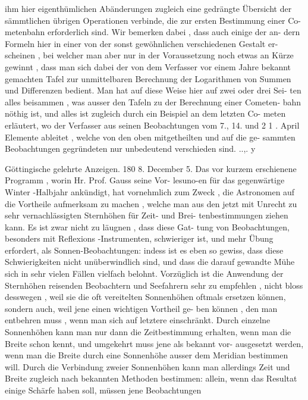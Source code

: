\documentclass[12pt,a4paper]{article}
\begin{document}
\newpage

ihm  hier  eigenthümlichen  Abänderungen  zugleich  eine  gedrängte  Übersicht  der
sämmtlichen  übrigen  Operationen  verbinde,  die  zur  ersten  Bestimmung  einer  Co-
metenbahn  erforderlich  sind.  Wir  bemerken  dabei ,  dass  auch  einige  der  an-
dern Formeln  hier  in  einer  von  der  sonst  gewöhnlichen  verschiedenen  Gestalt  er-
scheinen ,  bei  welcher  man  aber  nur  in  der  Voraussetzung  noch  etwas  an  Kürze
gewinnt ,  dass  man  sich  dabei  der  von  dem  Verfasser  vor  einem  Jahre  bekannt
gemachten  Tafel  zur  unmittelbaren  Berechnung  der  Logarithmen  von  Summen
und  Differenzen  bedient.  Man  hat  auf  diese  Weise  hier  auf  zwei  oder  drei  Sei-
ten alles  beisammen ,  was  ausser  den  Tafeln  zu  der  Berechnung  einer  Cometen-
bahn  nöthig  ist,  und  alles  ist  zugleich  durch  ein  Beispiel  an  dem  letzten  Co-
meten  erläutert,  wo  der  Verfasser  aus  seinen  Beobachtungen  vom  7.,  14.  und
2 1 .  April  Elemente  ableitet ,  welche  von  den  oben  mitgetheilten  und  auf  die  ge-
sammten  Beobachtungen  gegründeten  nur  unbedeutend  verschieden  sind.
..,.  y

\newpage

Göttingische  gelehrte  Anzeigen.     180  8.  December  5.
Das  vor  kurzem  erschienene  Programm ,  worin  Hr.  Prof.  Gauss  seine  Vor-
lesuno-en  für  das  gegenwärtige  Winter -Halbjahr  ankündigt,  hat  vornehmlich  zum
Zweck ,  die  Astronomen  auf  die  Vortheile  aufmerksam  zu  machen ,  welche  man
aus  den  jetzt  mit  Unrecht  zu  sehr  vernachlässigten  Sternhöhen  für  Zeit-  und  Brei-
tenbestimmungen ziehen  kann.  Es  ist  zwar  nicht  zu  läugnen ,  dass  diese  Gat-
tung von  Beobachtungen,  besonders  mit  Reflexions -Instrumenten,  schwieriger
ist,  und  mehr  Übung  erfordert,  als  Sonnen-Beobachtungen:  indess  ist  es  eben
so  gewiss,  dass  diese  Schwierigkeiten  nicht  unüberwindlich  sind,  und  dass  die
darauf  gewandte  Mühe  sich  in  sehr  vielen  Fällen  vielfach  belohnt.  Vorzüglich
ist  die  Anwendung  der  Sternhöhen  reisenden  Beobachtern  und  Seefahrern  sehr
zu  empfehlen ,  nicht  bloss  desswegen ,  weil  sie  die  oft  vereitelten  Sonnenhöhen
oftmals  ersetzen  können,  sondern  auch,  weil  jene  einen  wichtigen  Vortheil  ge-
ben können ,  den  man  entbehren  muss ,  wenn  man  sich  auf  letztere  einschränkt.
Durch  einzelne  Sonnenhöhen  kann  man  nur  dann  die  Zeitbestimmung  erhalten,
wenn  man  die  Breite  schon  kennt,  und  umgekehrt  muss  jene  als  bekannt  vor-
ausgesetzt werden,  wenn  man  die  Breite  durch  eine  Sonnenhöhe  ausser  dem
Meridian  bestimmen  will.  Durch  die  Verbindung  zweier  Sonnenhöhen  kann
man  allerdings  Zeit  und  Breite  zugleich  nach  bekannten  Methoden  bestimmen:
allein,  wenn  das  Resultat  einige  Schärfe  haben  soll,  müssen  jene  Beobachtungen
\end{document}
